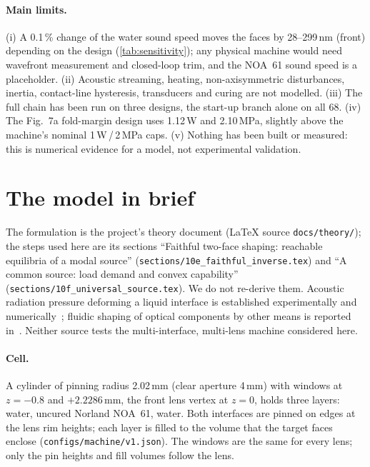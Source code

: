\documentclass[11pt,a4paper]{article}
\numberwithin{equation}{section}
\newcommand{\file}[1]{\nolinkurl{#1}}
\begin{document}
\paragraph{Main limits.} (i) A 0.1\,\% change of the water sound speed moves the
faces by 28--299\,nm (front) depending on the design (\cref{tab:sensitivity}); any
physical machine would need wavefront measurement and closed-loop trim, and the
NOA~61 sound speed is a placeholder. (ii) Acoustic streaming, heating,
non-axisymmetric disturbances, inertia, contact-line hysteresis, transducers and
curing are not modelled. (iii) The full chain has been run on three designs, the
start-up branch alone on all 68. (iv) The Fig.~7a fold-margin design uses 1.12\,W
and 2.10\,MPa, slightly above the machine's nominal 1\,W\,/\,2\,MPa caps.
(v) Nothing has been built or measured: this is numerical evidence for a model,
not experimental validation.

\section{The model in brief}\label{sec:model}

The formulation is the project's theory document (LaTeX source
\file{docs/theory/}); the steps used here are its sections \enquote{Faithful
two-face shaping: reachable equilibria of a modal source}
(\file{sections/10e_faithful_inverse.tex}) and \enquote{A common source: load
demand and convex capability} (\file{sections/10f_universal_source.tex}). We do
not re-derive them. Acoustic radiation pressure deforming a liquid interface is
established experimentally and numerically~\cite{bertin2012,chesneau2022,sisombat2023};
fluidic shaping of optical components by other means is reported
in~\cite{elgarisi2021}. Neither source tests the multi-interface, multi-lens
machine considered here.

\paragraph{Cell.} A cylinder of pinning radius 2.02\,mm (clear aperture 4\,mm)
with windows at $z=-0.8$ and $+2.2286$\,mm, the front lens vertex at $z=0$, holds
three layers: water, uncured Norland NOA~61, water. Both interfaces are pinned on
edges at the lens rim heights; each layer is filled to the volume that the target
faces enclose (\file{configs/machine/v1.json}). The windows are the same for every
lens; only the pin heights and fill volumes follow the lens.
\end{document}
